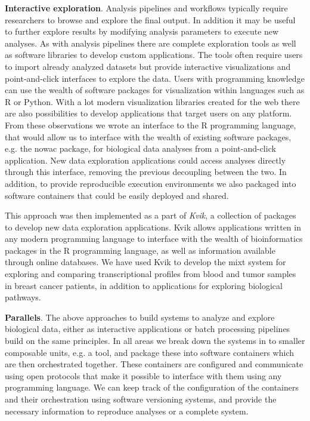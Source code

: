 \textbf{Interactive exploration}. Analysis pipelines and workflows typically
require researchers to browse and explore the final output. In addition it may
be useful to further explore results by modifying analysis parameters to execute
new analyses. As with analysis pipelines there are complete exploration tools as
well as software libraries to develop custom applications. The tools often
require users to import already analyzed datasets but provide interactive
visualizations and point-and-click interfaces to explore the data. Users with
programming knowledge can use the wealth of software packages for visualization
within languages such as R or Python. With a lot modern visualization libraries
created for the web there are also possibilities to develop applications that
target users on any platform. From these observations we wrote an interface to
the R programming language, that would allow us to interface with the wealth of
existing software packages, e.g. the \gls{nowac} package, for biological data
analyses from a point-and-click application. New data exploration applications
could access analyses directly through this interface, removing the previous
decoupling between the two. In addition, to provide reproducible execution
environments we also packaged into software containers that could be easily
deployed and shared. 

This approach was then implemented as a part of \emph{Kvik}, a collection of
packages to develop new data exploration applications. Kvik allows
applications written in any modern programming language to interface with the
wealth of bioinformatics packages in the R programming language, as well as
information available through online databases. We have used Kvik to develop the
\gls{mixt} system for exploring and comparing transcriptional profiles from
blood and tumor samples in breast cancer patients, in addition to applications
for exploring biological pathways. 

\textbf{Parallels}. 
The above approaches to build systems to analyze and explore biological data,
either as interactive applications or batch processing pipelines build on the
same principles.  In all areas we break down the systems in to smaller
composable units, e.g. a tool, and package these into software containers which
are then orchestrated together. These containers are configured and communicate
using open protocols that make it possible to interface with them using any
programming language. We can keep track of the configuration of the containers
and their orchestration using software versioning systems, and provide the
necessary information to reproduce analyses or a complete system. 

